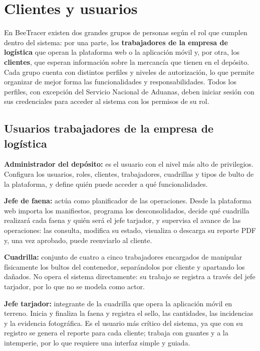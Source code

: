 \chapter{Clientes y usuarios}
\label{cap:clientes}

En BeeTracer existen dos grandes grupos de personas según el rol que cumplen dentro del sistema:
por una parte, los \textbf{trabajadores de la empresa de logística} que operan la plataforma web o
la aplicación móvil y, por otra, los \textbf{clientes}, que esperan información sobre la mercancía
que tienen en el depósito. Cada grupo cuenta con distintos perfiles y niveles de autorización, lo
que permite organizar de mejor forma las funcionalidades y responsabilidades. Todos los perfiles,
con excepción del Servicio Nacional de Aduanas, deben iniciar sesión con sus credenciales para
acceder al sistema con los permisos de su rol.

\section{Usuarios trabajadores de la empresa de logística}
\label{sec:usuarios_trabajadores}

\textbf{Administrador del depósito:} es el usuario con el nivel más alto de privilegios. Configura
los usuarios, roles, clientes, trabajadores, cuadrillas y tipos de bulto de la plataforma, y define
quién puede acceder a qué funcionalidades.

\textbf{Jefe de faena:} actúa como planificador de las operaciones. Desde la plataforma web importa
los manifiestos, programa los desconsolidados, decide qué cuadrilla realizará cada faena y quién
será el jefe tarjador, y supervisa el avance de las operaciones: las consulta, modifica su estado,
visualiza o descarga su reporte PDF y, una vez aprobado, puede reenviarlo al cliente.

\textbf{Cuadrilla:} conjunto de cuatro a cinco trabajadores encargados de manipular físicamente los
bultos del contenedor, separándolos por cliente y apartando los dañados. No opera el sistema
directamente: su trabajo se registra a través del jefe tarjador, por lo que no se modela como
actor.

\textbf{Jefe tarjador:} integrante de la cuadrilla que opera la aplicación móvil en terreno. Inicia
y finaliza la faena y registra el sello, las cantidades, las incidencias y la evidencia
fotográfica. Es el usuario más crítico del sistema, ya que con su registro se genera el reporte
para cada cliente; trabaja con guantes y a la intemperie, por lo que requiere una interfaz simple
y guiada.

